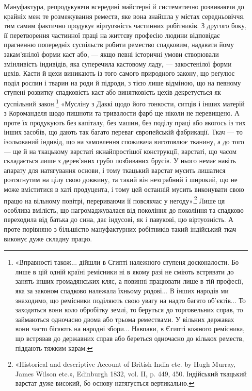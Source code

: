 Мануфактура, репродукуючи всередині майстерні й систематично
розвиваючи до крайніх меж те розмежування реместв,
яке вона знайшла у містах середньовіччя, тим самим фактично
продукує віртуозність частинних робітників. З другого боку, її
перетворення частинної праці на життєву професію людини
відповідає прагненню попередніх суспільств робити ремество спадковим,
надавати йому закам’янілої форми каст або, — якщо
певні історичні умови створювали змінливість індивідів, яка
суперечила кастовому ладу, — закостенілої форми цехів. Касти
й цехи виникають із того самого природного закону, що реґулює
поділ рослин і тварин на роди й підроди, з тією лише відміною,
що на певному ступені розвитку спадковість каст або винятковість
цехів декретується як суспільний закон.\footnote{
«Вправності також... дійшли в Єгипті належного ступеня досконалости.
Бо лише в цій одній країні ремісники ні в якому разі не сміють
встрявати до занять інших громадянських кляс, а повинні працювати
лише в тій професії, яка за законом спадково належала їхньому родові...
В інших народів ми знаходимо, що ремісники поділяють свою увагу на
надто багато об'єктів... То заходяться вони коло обробітку землі, то беруться
до торговельних справ, то займаються одночасно двома або трьома
ремествами. У вільних державах вони часто бігають на народні збори...
Навпаки, в Єгипті кожного ремісника, що встрявав до державних справ
або береться одночасно до кількох реместв, піддають тяжким карам.
} «Мусліну з Даккі
щодо його тонкости, ситців і інших матерій з Короманделя щодо
пишноти та тривалости фарб ще ніколи не перевищено. А проте
їх продукують без капіталу, без машин, без поділу праці або
якогось із тих інших засобів, що дають так багато переваг європейській фабрикації. Ткач — то
ізольований індивід, що на замовлення споживача виготовлює тканину, а до того — ще й на ткацькому
варстаті якнайпростішої конструкції, варстаті, що
часом складається лише з дерев’яних грубо позбиваних брусів.
У нього немає навіть апарату для натягування основи, і тому
ткацький варстат мусить лишатися розтягнутим на цілу свою
довжину, та такий він незграбний і широкий, що не може вміститися в хаті продуцента, і тому цей
останній мусить виконувати свою працю на вільному повітрі, перериваючи її повсякчас у негоду».\footnote{
«Historical and descriptive Account of British India etc. by
Hugh Murray, James Wilson etc.», Edinburgh 1832, vol. II, p. 449, 450.
Індійський ткацький варстат дуже високий, бо основу натягується вертикально.
}
Лише ця особлива вмілість, що нагромаджувалася
від покоління до покоління та спадково переходила від батька
до сина, дає індусові, як і павукові, цю віртуозність. А проте
порівняно з більшістю мануфактурних робітників такий індійський ткач виконує дуже складну працю.

